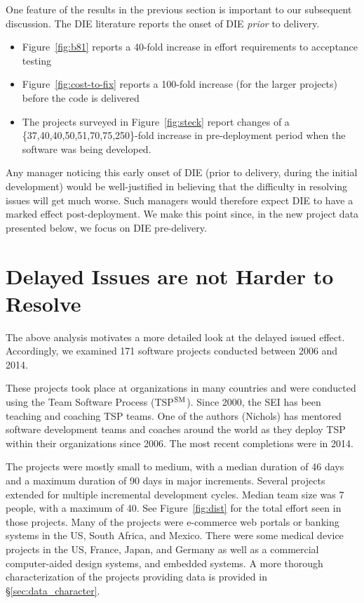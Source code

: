 \documentclass[smallcondensed]{svjour3}
\newcommand{\bi}{\begin{itemize}}%
\newcommand{\ei}{\end{itemize}}
\newcommand{\fig}[1]{Figure~\ref{fig:#1}}
\begin{document}
One feature of the results in the previous section is important to our subsequent discussion.  
The DIE literature reports the onset of  DIE  {\em prior} to delivery.
\bi
\item  
\fig{b81} reports a 40-fold increase in effort requirements to acceptance testing
\item
 \fig{cost-to-fix} reports a 100-fold increase
(for the larger projects) before the code is delivered 
\item
The projects surveyed in \fig{steck} report changes of a  
\{37,40,40,50,51,70,75,250\}-fold increase in pre-deployment period when the software was being developed.
\ei
Any manager noticing this  early onset of DIE (prior to delivery, during the initial development)
would be well-justified
in believing that  the difficulty in resolving issues  will get much worse. Such managers
would therefore expect DIE to have a marked effect post-deployment.
We make this point since,  in the new project data presented below, we focus on DIE pre-delivery.


 

\section{Delayed Issues are not  Harder  to Resolve}

The above analysis motivates a more detailed look at the delayed issued effect.  
Accordingly, we examined 171 software projects conducted between 2006 and 2014. 

These projects took place at organizations in many countries and were conducted using  the Team Software Process (TSP$\textsuperscript{SM}$). Since 2000, the SEI has been teaching and coaching TSP teams. One of the authors (Nichols) has mentored software development teams and coaches around the world as they deploy TSP within their organizations since 2006.  The  most recent completions were in 2014.

The projects were mostly small to medium, with a median duration of 46 days and a maximum duration of 90 days in major increments. 
Several projects extended for multiple incremental development cycles. 
Median team size was 7 people, with a maximum of 40. See \fig{dist} for the total
effort seen in those projects. Many of the projects were e-commerce web portals or banking systems in the US, South Africa, and Mexico. 
There were  some  medical device projects in  the US, France, Japan, and Germany as well  as a commercial computer-aided design systems, and embedded systems. A more thorough characterization of the projects providing data is provided in \S\ref{sec:data_character}.
\end{document}
